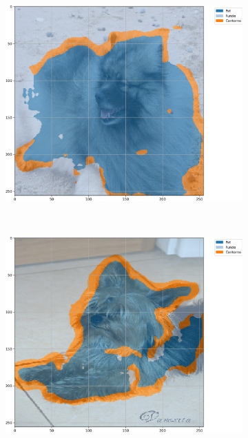 \begin{figure}[H]
    \centering
    \caption{Exemplos segmentados a partir de U-Net com BPCAPooling e 500 épocas no conjunto de dados \textit{Oxford-IIIT Pets} baseada em mIoU.}
    \label{results:fig:semantic:3}
     \begin{subfigure}[t]{0.32\textwidth}
         \centering
         \includegraphics[width=1\linewidth]{recursos/imagens/results/bpca_miou_unet500_image_0_overlayed_segmentation.png}
         \label{results:fig:semantic:3.1}
     \end{subfigure}%
     ~ 
     \begin{subfigure}[t]{0.32\textwidth}
         \centering
         \includegraphics[width=1\linewidth]{recursos/imagens/results/bpca_miou_unet500_image_1_overlayed_segmentation.png}

\end{subfigure}
\end{figure}
